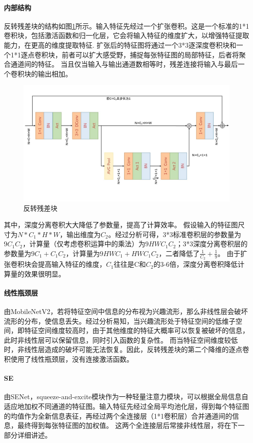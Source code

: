\documentclass[11pt]{article}
\begin{document}
\paragraph{内部结构}反转残差块的结构如图\ref{fig:1}所示。输入特征先经过一个扩张卷积。这是一个标准的1*1卷积块，包括激活函数和归一化层，它会将输入特征的维度扩大，以增强特征提取能力，在更高的维度提取特征.
扩张后的特征图将通过一个3*3逐深度卷积块和一个1*1逐点卷积块，前者可以扩大感受野，捕捉每张特征图的局部特征，后者将聚合通道间的特征。
当且仅当输入与输出通道数相等时，残差连接将输入与最后一个卷积块的输出相加。
\begin{figure}[!h]
  \centering
  \includegraphics[width=12cm]{res.png}

  \centering
  \caption{反转残差块}
  \label{fig:1}
\end{figure}

其中，深度分离卷积大大降低了参数量，提高了计算效率。
假设输入的特征图尺寸为$N*C_1*H*W$，输出维度为$C_2$。经过分析可得，3*3标准卷积层的参数量为$9C_1C_2$，计算量（仅考虑卷积运算中的乘法）为$9HWC_1C_2$；3*3深度分离卷积层的参数量为$9C_1+C_1C_2$，计算量为$9HWC_1+HWC_1C_2$，二者降低了$\frac1{C_2}+\frac19$。
由于扩张卷积块会提高输入特征的维度，$C_1$往往是C和$C_2$的3-6倍，深度分离卷积降低计算量的效果很明显。
\paragraph{线性瓶颈层}由MobileNetV2\cite{ref11}，若将特征空间中信息的分布视为兴趣流形，那么非线性层会破坏流形的分布，使信息丢失。经过分析易知，当兴趣流形处于特征空间的低维子空间，即特征空间维度较高时，由于其他维度的特征大概率可以恢复被破坏的信息，此时非线性层可以保留信息，同时引入函数的复杂性。
而当特征空间维度较低时，非线性层造成的破坏可能无法恢复。因此，反转残差块的第二个降维的逐点卷积使用了线性瓶颈层，没有连接激活函数。


\paragraph{SE}
由SENet\cite{se}，squeeze-and-excite模块作为一种轻量注意力模块，可以根据全局信息自适应地加权不同通道的特征图。输入特征先经过全局平均池化层，得到每个特征图的均值作为全新信息表征，再经过两个全连接层（1*1卷积层）合并通道间的信息，最终得到每张特征图的加权值。
这两个全连接层后常接非线性层，将在下一部分详细讲述。
\end{document}
